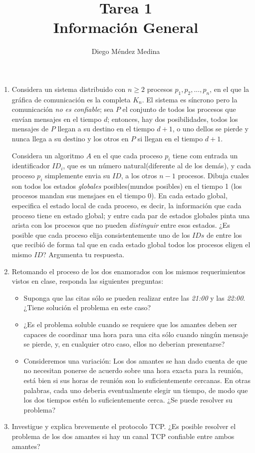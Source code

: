 \documentclass[8pt, letterpaper]{article}
\title{%
  Tarea 1\\
  {\large{Información General}}}
\author{Diego Méndez Medina}
\begin{document}
\ttfamily
\maketitle
\rmfamily
\begin{enumerate}
\item Considera un sistema distribuido con $n \geq 2$ procesos
  $p_1, p_2, ..., p_n$, en el que la gráfica de comunicación es la completa
  $K_n$. El sistema es síncrono pero la comunicación \textit{no es confiable};
  sea $P$ el conjunto de todos los procesos que envían mensajes en el tiempo
  $d$; entonces, hay dos posibilidades, todos los mensajes de $P$ llegan a su
  destino en el tiempo $d+1$, o uno dellos se pierde y nunca llega a su destino
  y los otros en $P$ si llegan en el tiempo $d+1$.

  Considera un algoritmo $A$ en el que cada proceso $p_i$ tiene com entrada un
  identificador $ID_i$, que es un número natural(diferente al de los demás),
  y cada proceso $p_i$ simplemente envia su $ID$, a los otros $n-1$ procesos.
  Dibuja cuales son todos los estados \textit{globales} posibles(mundos posibles) en el tiempo 1 (los procesos mandan sus mensjaes en el tiempo 0). En cada estado global, especifica el estado local de cada proceso, es decir, la información
  que cada proceso tiene en estado global; y entre cada par de estados globales pinta una arista con los procesos que no pueden \textit{distinguir} entre esos 
  estados. ¿Es posible que cada proceso elija consistentemente uno de los $IDs$
  de entre los que recibió de forma tal que en cada estado global todos los
  procesos eligen el mismo $ID$? Argumenta tu respuesta.
  \ttfamily
  
  \rmfamily
  \newpage
\item Retomando el proceso de los dos enamorados con los mismos requerimientos
  vistos en clase, responda las siguientes preguntas:
  \begin{itemize}
  \item Suponga que las citas sólo se pueden realizar entre las \textit{21:00}
    y las \textit{22:00}. ¿Tiene solución el problema en este caso?
  \item ¿Es el problema soluble cuando se requiere que los amantes deben
    ser capaces de coordinar una hora para una cita sólo cuando ningún mensaje
    se pierde, y, en cualquier otro caso, ellos no deberian presentarse?
  \item Consideremos una variación: Los dos amantes se han dado cuenta de que no
    necesitan ponerse de acuerdo sobre una hora exacta para la reunión, está
    bien si sus horas de reunión son lo suficientemente cercanas.
    En otras palabras, cada uno deberia eventualmente elegir un tiempo,
    de modo que los dos tiempos estén lo suficientemente cerca. ¿Se puede
    resolver su problema?
  \end{itemize}
  \ttfamily
  
  \rmfamily
\item Investigue y explica brevemente el protocolo TCP. ¿Es posible resolver
  el problema de los dos amantes si hay un canal TCP confiable entre ambos
  amantes?
  \ttfamily
  
  \end{enumerate}
\end{document}
